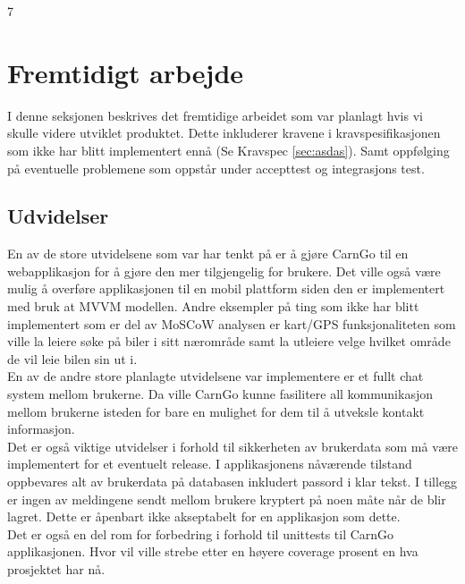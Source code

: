 7\documentclass[Rapport/Rapport_main.tex]{subfiles}
\begin{document}
\section{Fremtidigt arbejde}
I denne seksjonen beskrives det fremtidige arbeidet som var planlagt hvis vi skulle videre utviklet produktet. Dette inkluderer kravene i kravspesifikasjonen som ikke har blitt implementert ennå (Se Kravspec \ref{sec:asdas}). Samt oppfølging på eventuelle problemene som oppstår under accepttest og integrasjons test.
\subsection{Udvidelser}
En av de store utvidelsene som var har tenkt på er å gjøre CarnGo til en webapplikasjon for å gjøre den mer tilgjengelig for brukere. Det ville også være mulig å overføre applikasjonen til en mobil plattform siden den er implementert med bruk at MVVM modellen. Andre eksempler på ting som ikke har blitt implementert som er del av MoSCoW analysen er kart/GPS funksjonaliteten som ville la leiere søke på biler i sitt nærområde samt la utleiere velge hvilket område de vil leie bilen sin ut i.\\

En av de andre store planlagte utvidelsene var implementere er et fullt chat system mellom brukerne. Da ville CarnGo kunne fasilitere all kommunikasjon mellom brukerne isteden for bare en mulighet for dem til å utveksle kontakt informasjon.\\

Det er også viktige utvidelser i forhold til sikkerheten av brukerdata som må være implementert for et eventuelt release. I applikasjonens nåværende tilstand oppbevares alt av brukerdata på databasen inkludert passord i klar tekst. I tillegg er ingen av meldingene sendt mellom brukere kryptert på noen måte når de blir lagret. Dette er åpenbart ikke akseptabelt for en applikasjon som dette.\\

Det er også en del rom for forbedring i forhold til unittests til CarnGo applikasjonen. Hvor vil ville strebe etter en høyere coverage prosent en hva prosjektet har nå.
\end{document}
